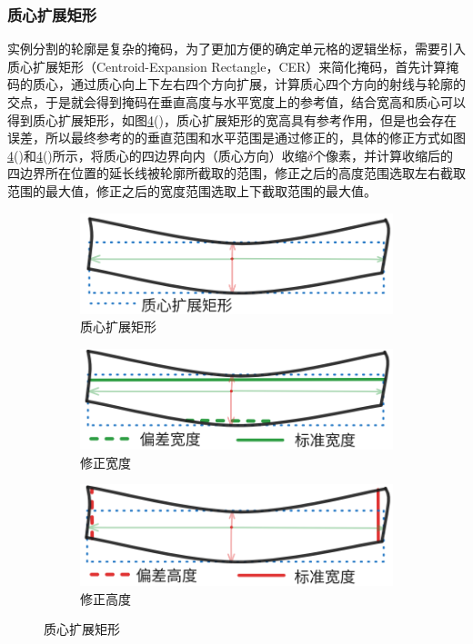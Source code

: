\documentclass[number, UTF8,12pt, AutoFakeBold,fontset = founder]{ctexart}
\begin{document}
\subsubsection{质心扩展矩形}

实例分割的轮廓是复杂的掩码，为了更加方便的确定单元格的逻辑坐标，需要引入质心扩展矩形（Centroid-Expansion Rectangle，CER）来简化掩码，首先计算掩码的质心，通过质心向上下左右四个方向扩展，计算质心四个方向的射线与轮廓的交点，于是就会得到掩码在垂直高度与水平宽度上的参考值，结合宽高和质心可以得到质心扩展矩形，如图\ref{fig:r}()，质心扩展矩形的宽高具有参考作用，但是也会存在误差，所以最终参考的的垂直范围和水平范围是通过修正的，具体的修正方式如图\ref{fig:r}()和\ref{fig:r}()所示，将质心的四边界向内（质心方向）收缩$\delta $个像素，并计算收缩后的四边界所在位置的延长线被轮廓所截取的范围，修正之后的高度范围选取左右截取范围的最大值，修正之后的宽度范围选取上下截取范围的最大值。

\begin{figure}[H]
    \centering
    \begin{subfigure}[b]{0.3\textwidth}
        \includegraphics[width=\textwidth]{../images/CER.png}
        \caption{质心扩展矩形}
        \label{fig:CER}
    \end{subfigure}
    \hfill
    \begin{subfigure}[b]{0.3\textwidth}
        \includegraphics[width=\textwidth]{../images/x.png}
        \caption{修正宽度}
        \label{fig:w-re}
    \end{subfigure}
    \hfill
    \begin{subfigure}[b]{0.3\textwidth}
        \includegraphics[width=\textwidth]{../images/y.png}
        \caption{修正高度}
        \label{fig:h-re}
    \end{subfigure}
    \caption{质心扩展矩形}
    \label{fig:r}
\end{figure}
\end{document}
